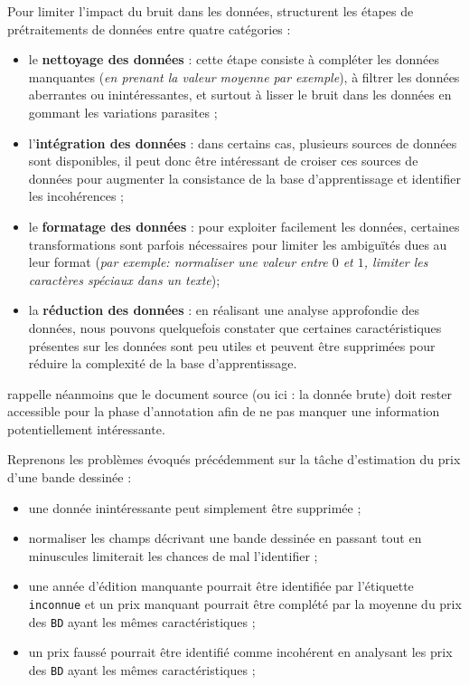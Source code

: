			Pour limiter l'impact du bruit dans les données, \cite{alasadi-bhaya:2017:review-data-preprocessing} structurent les étapes de prétraitements de données entre quatre catégories :
			\begin{itemize}
				\item le \textbf{nettoyage des données} : cette étape consiste à compléter les données manquantes (\textit{en prenant la valeur moyenne par exemple}), à filtrer les données aberrantes ou inintéressantes, et surtout à lisser le bruit dans les données en gommant les variations parasites ;
				\item l'\textbf{intégration des données} : dans certains cas, plusieurs sources de données sont disponibles, il peut donc être intéressant de croiser ces sources de données pour augmenter la consistance de la base d'apprentissage et identifier les incohérences ;
				\item le \textbf{formatage des données} : pour exploiter facilement les données, certaines transformations sont parfois nécessaires pour limiter les ambiguïtés dues au leur format (\textit{par exemple: normaliser une valeur entre $0$ et $1$, limiter les caractères spéciaux dans un texte});
				\item la \textbf{réduction des données} : en réalisant une analyse approfondie des données, nous pouvons quelquefois constater que certaines caractéristiques présentes sur les données sont peu utiles et peuvent être supprimées pour réduire la complexité de la base d'apprentissage.
			\end{itemize}
			\cite{baledent:2022:complexite-annotation-manuelle} rappelle néanmoins que le document source (ou ici : la donnée brute) doit rester accessible pour la phase d'annotation afin de ne pas manquer une information potentiellement intéressante.
			\begin{leftBarExamples}
				Reprenons les problèmes évoqués précédemment sur la tâche d'estimation du prix d'une bande dessinée :
				\begin{itemize}
					\item une donnée inintéressante peut simplement être supprimée ;
					\item normaliser les champs décrivant une bande dessinée en passant tout en minuscules limiterait les chances de mal l'identifier ;
					\item une année d'édition manquante pourrait être identifiée par l'étiquette \texttt{inconnue} et un prix manquant pourrait être complété par la moyenne du prix des \texttt{BD} ayant les mêmes caractéristiques ;
					\item un prix faussé pourrait être identifié comme incohérent en analysant les prix des \texttt{BD} ayant les mêmes caractéristiques ;
				\end{itemize}
			\end{leftBarExamples}
		
